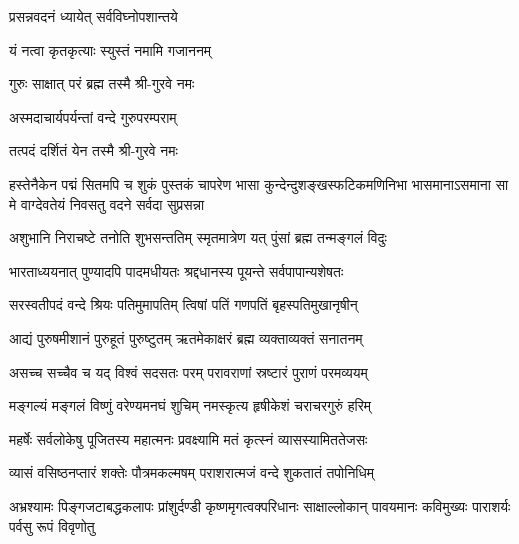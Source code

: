 \label{sec:start}

{प्रसन्नवदनं ध्यायेत् सर्वविघ्नोपशान्तये}

{यं नत्वा कृतकृत्याः स्युस्तं नमामि गजाननम्}


{गुरुः साक्षात् परं ब्रह्म तस्मै श्री-गुरवे नमः}

{अस्मदाचार्यपर्यन्तां वन्दे गुरुपरम्पराम्}

{तत्पदं दर्शितं येन तस्मै श्री-गुरवे नमः}

{हस्तेनैकेन पद्मं सितमपि च शुकं पुस्तकं चापरेण}
{भासा कुन्देन्दुशङ्खस्फटिकमणिनिभा भासमानाऽसमाना}
{सा मे वाग्देवतेयं निवसतु वदने सर्वदा सुप्रसन्ना}



\twolineshloka
{अशुभानि निराचष्टे तनोति शुभसन्ततिम्}
{स्मृतमात्रेण यत् पुंसां ब्रह्म तन्मङ्गलं विदुः}

\twolineshloka
{भारताध्ययनात् पुण्यादपि पादमधीयतः}
{श्रद्दधानस्य पूयन्ते सर्वपापान्यशेषतः}

\twolineshloka
{सरस्वतीपदं वन्दे श्रियः पतिमुमापतिम्}
{त्विषां पतिं गणपतिं बृहस्पतिमुखानृषीन्}

\twolineshloka
{आद्यं पुरुषमीशानं पुरुहूतं  पुरुष्टुतम्}
{ऋतमेकाक्षरं ब्रह्म व्यक्ताव्यक्तं सनातनम्}

\twolineshloka
{असच्च सच्चैव च यद् विश्वं सदसतः परम्}
{परावराणां स्रष्टारं पुराणं परमव्ययम्}

\twolineshloka
{मङ्गल्यं मङ्गलं विष्णुं वरेण्यमनघं शुचिम्}
{नमस्कृत्य हृषीकेशं चराचरगुरुं हरिम्}

\resetShloka


\twolineshloka
{महर्षेः सर्वलोकेषु पूजितस्य महात्मनः}
{प्रवक्ष्यामि मतं कृत्स्नं व्यासस्यामिततेजसः}

\twolineshloka
{व्यासं वसिष्ठनप्तारं शक्तेः पौत्रमकल्मषम्}
{पराशरात्मजं वन्दे शुकतातं तपोनिधिम्}

\fourlineindentedshloka
{अभ्रश्यामः पिङ्गजटाबद्धकलापः}
{प्रांशुर्दण्डी कृष्णमृगत्वक्परिधानः}
{साक्षाल्लोकान् पावयमानः कविमुख्यः}
{पाराशर्यः पर्वसु रूपं विवृणोतु}

